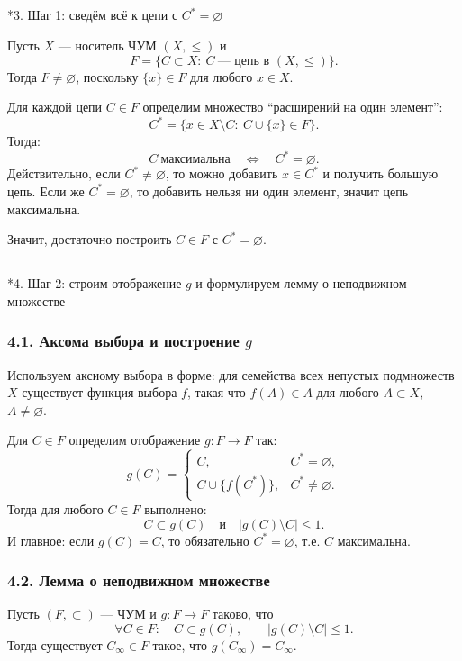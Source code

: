 \subsection{}*{3. Шаг 1: сведём всё к цепи с $C^{*}=\varnothing$}

Пусть $X$ --- носитель ЧУМ $(X,\le)$ и
\[
    F=\{C\subset X:\ C \ \text{--- цепь в }(X,\le)\}.
\]
Тогда $F\neq\varnothing$, поскольку $\{x\}\in F$ для любого $x\in X$.

Для каждой цепи $C\in F$ определим множество ``расширений на один элемент'':
\[
    C^{*}=\{x\in X\setminus C:\ C\cup\{x\}\in F\}.
\]
Тогда:
\[
    C\ \text{максимальна}\quad\Longleftrightarrow\quad C^{*}=\varnothing.
\]
Действительно, если $C^{*}\neq\varnothing$, то можно добавить $x\in C^{*}$ и получить большую цепь.
Если же $C^{*}=\varnothing$, то добавить нельзя ни один элемент, значит цепь максимальна.

Значит, достаточно построить $C\in F$ с $C^{*}=\varnothing$.

\subsection{}*{4. Шаг 2: строим отображение $g$ и формулируем лемму о неподвижном множестве}

\subsubsection*{4.1. Аксома выбора и построение $g$}
Используем аксиому выбора в форме: для семейства всех непустых подмножеств $X$ существует функция выбора
$f$, такая что $f(A)\in A$ для любого $A\subset X$, $A\neq\varnothing$.

Для $C\in F$ определим отображение $g:F\to F$ так:
\[
    g(C)=
    \begin{cases}
        C, & C^{*}=\varnothing,\\
        C\cup\{f(C^{*})\}, & C^{*}\neq\varnothing.
    \end{cases}
\]
Тогда для любого $C\in F$ выполнено:
\[
    C\subset g(C)\quad\text{и}\quad |g(C)\setminus C|\le 1.
\]
И главное: если $g(C)=C$, то обязательно $C^{*}=\varnothing$, т.е. $C$ максимальна.

\subsubsection*{4.2. Лемма о неподвижном множестве}
\begin{lemma}
    Пусть $(F,\subset)$ --- ЧУМ и $g:F\to F$ таково, что
    \[
        \forall C\in F:\quad C\subset g(C),\qquad |g(C)\setminus C|\le 1.
    \]
    Тогда существует $C_{\infty}\in F$ такое, что $g(C_{\infty})=C_{\infty}$.
\end{lemma}

